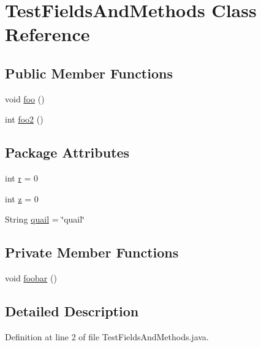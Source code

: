 \hypertarget{classTestFieldsAndMethods}{
\section{TestFieldsAndMethods Class Reference}
\label{classTestFieldsAndMethods}
}
\subsection*{Public Member Functions}
\begin{DoxyCompactItemize}
\item 
void \hyperlink{classTestFieldsAndMethods_a9e9775d1ee84ac8ac2ac9febba0c105c}{foo} ()
\item 
int \hyperlink{classTestFieldsAndMethods_ac882fcf5d58ba930c44bdc84b006a1e2}{foo2} ()
\end{DoxyCompactItemize}
\subsection*{Package Attributes}
\begin{DoxyCompactItemize}
\item 
int \hyperlink{classTestFieldsAndMethods_a0d6af3a3e13ad181f3da6064c318534c}{r} = 0
\item 
int \hyperlink{classTestFieldsAndMethods_ab70e2271f70c0c613b1ceab5a1066594}{z} = 0
\item 
String \hyperlink{classTestFieldsAndMethods_ac4d089475c4081e9840de7180babfb55}{quail} = \char`\"{}quail\char`\"{}
\end{DoxyCompactItemize}
\subsection*{Private Member Functions}
\begin{DoxyCompactItemize}
\item 
void \hyperlink{classTestFieldsAndMethods_a3dc3ed089e4c81877498fba3a913fd46}{foobar} ()
\end{DoxyCompactItemize}


\subsection{Detailed Description}


Definition at line 2 of file TestFieldsAndMethods.java.



